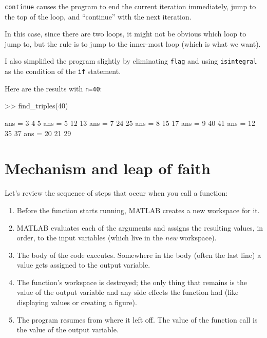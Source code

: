 \documentclass[
]{book}
\numberwithin{Answer}{chapter}
\numberwithin{Exercise}{chapter}
\begin{document}
{\tt continue} causes the program to end the current iteration
immediately, jump to the top of the loop, and ``continue'' with the next iteration.

In this case, since there are two loops, it might not be obvious which loop to jump to, but the rule is to jump to the inner-most loop (which is what we want).

I also simplified the program slightly by eliminating {\tt flag} and using {\tt isintegral} as the condition of the {\tt if} statement.

Here are the results with {\tt n=40}:

\begin{code}
>> find_triples(40)

ans =  3     4     5
ans =  5    12    13
ans =  7    24    25
ans =  8    15    17
ans =  9    40    41
ans = 12    35    37
ans = 20    21    29
\end{code}


\section{Mechanism and leap of faith}

Let's review the sequence of steps that occur when you call a function:

\begin{enumerate}

\item Before the function starts running, MATLAB creates a new
workspace for it.

\item MATLAB evaluates each of the arguments and assigns
the resulting values, in order, to the input variables (which
live in the {\em new} workspace).

\item The body of the code executes.  Somewhere in the body
(often the last line) a value gets assigned to the output variable.

\item The function's workspace is destroyed; the only thing
that remains is the value of the output variable and any side
effects the function had (like displaying values or creating
a figure).

\item The program resumes from where it left off.  The value
of the function call is the value of the output variable.

\end{enumerate}
\end{document}
